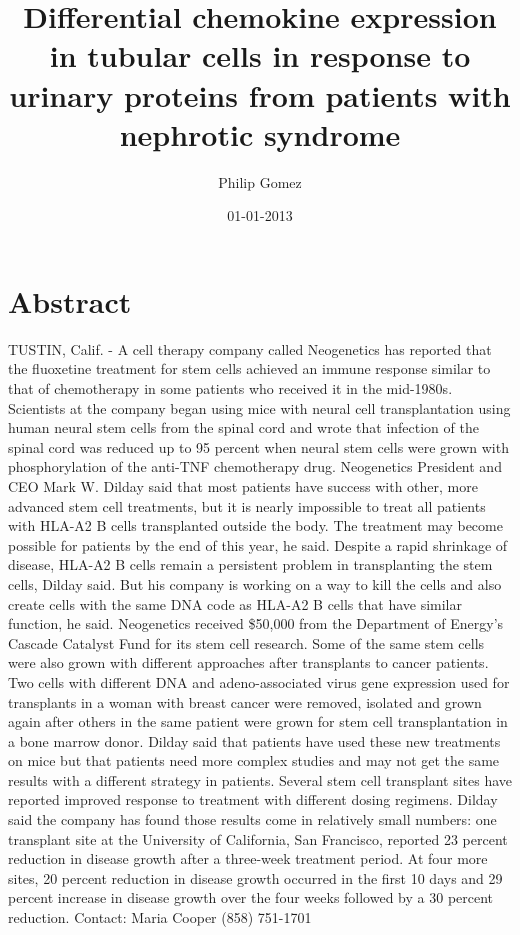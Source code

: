 \documentclass{article}%
\title{Differential chemokine expression in tubular cells in response to urinary proteins from patients with nephrotic syndrome}%
\author{Philip Gomez}%
\affil{Department of Pathology, Microbiology and Immunology, School of Medicine, University of South Carolina, Columbia, South Carolina, United States of America}%
\date{01{-}01{-}2013}%
\begin{document}
%
\normalsize%
\maketitle%
\section{Abstract}%
\label{sec:Abstract}%
TUSTIN, Calif. {-} A cell therapy company called Neogenetics has reported that the fluoxetine treatment for stem cells achieved an immune response similar to that of chemotherapy in some patients who received it in the mid{-}1980s.\newline%
Scientists at the company began using mice with neural cell transplantation using human neural stem cells from the spinal cord and wrote that infection of the spinal cord was reduced up to 95 percent when neural stem cells were grown with phosphorylation of the anti{-}TNF chemotherapy drug.\newline%
Neogenetics President and CEO Mark W. Dilday said that most patients have success with other, more advanced stem cell treatments, but it is nearly impossible to treat all patients with HLA{-}A2 B cells transplanted outside the body. The treatment may become possible for patients by the end of this year, he said.\newline%
Despite a rapid shrinkage of disease, HLA{-}A2 B cells remain a persistent problem in transplanting the stem cells, Dilday said. But his company is working on a way to kill the cells and also create cells with the same DNA code as HLA{-}A2 B cells that have similar function, he said.\newline%
Neogenetics received \$50,000 from the Department of Energy's Cascade Catalyst Fund for its stem cell research.\newline%
Some of the same stem cells were also grown with different approaches after transplants to cancer patients. Two cells with different DNA and adeno{-}associated virus gene expression used for transplants in a woman with breast cancer were removed, isolated and grown again after others in the same patient were grown for stem cell transplantation in a bone marrow donor.\newline%
Dilday said that patients have used these new treatments on mice but that patients need more complex studies and may not get the same results with a different strategy in patients.\newline%
Several stem cell transplant sites have reported improved response to treatment with different dosing regimens. Dilday said the company has found those results come in relatively small numbers: one transplant site at the University of California, San Francisco, reported 23 percent reduction in disease growth after a three{-}week treatment period. At four more sites, 20 percent reduction in disease growth occurred in the first 10 days and 29 percent increase in disease growth over the four weeks followed by a 30 percent reduction.\newline%
Contact: Maria Cooper\newline%
(858) 751{-}1701
\end{document}
